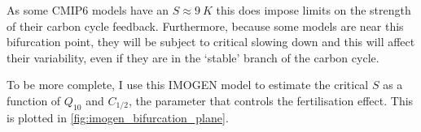 As some CMIP6 models have an $S \approx\SI{9}{K}$ this does impose limits on the strength of their carbon cycle feedback. Furthermore, because some models are
near this bifurcation point, they will be subject to critical slowing down and this will affect their variability, even if they are in the `stable' branch of the carbon cycle.
%

To be more complete, I use this IMOGEN model to estimate the critical $S$ as a function of $Q_{10}$ and $C_{1/2}$, the parameter that controls the  fertilisation effect. This
is plotted in \cref{fig:imogen_bifurcation_plane}.

